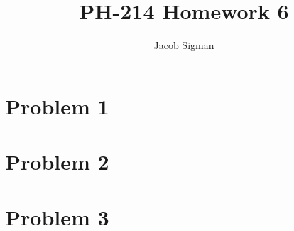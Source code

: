 \documentclass{article}
\title{PH-214 Homework 6}
\author{Jacob Sigman}
\date{}
\begin{document}
\maketitle
\section*{Problem 1}

\section*{Problem 2}

\section*{Problem 3}
\end{document}
